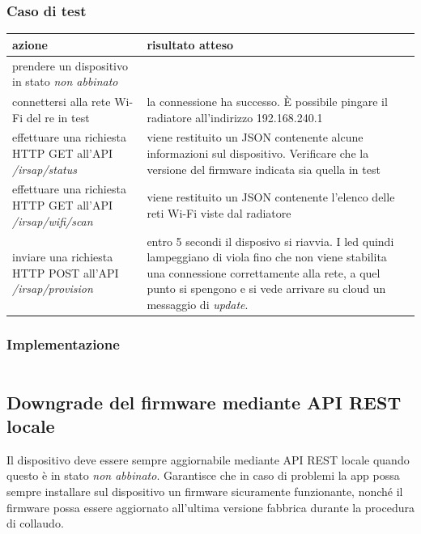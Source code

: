 \documentclass[12pt,a4paper,twoside,titlepage]{book}
\begin{document}
\subsubsection{Caso di test}
\begin{center}
\begin{tabular}{| p{} | p{} |}
    \hline \textbf{azione} & \textbf{risultato atteso} \\
    \hline prendere un dispositivo in stato \textit{non abbinato} & \\
    \hline connettersi alla rete Wi-Fi del \Gls{re} in test & la connessione ha successo. È possibile pingare il radiatore all'indirizzo 192.168.240.1 \\
    \hline effettuare una richiesta HTTP GET all'API \textit{/irsap/status} & viene restituito un JSON contenente alcune informazioni sul dispositivo. Verificare che la versione del \gls{firmware} indicata sia quella in test \\
    \hline effettuare una richiesta HTTP GET all'API \textit{/irsap/wifi/scan} & viene restituito un JSON contenente l'elenco delle reti Wi-Fi viste dal radiatore \\
    \hline inviare una richiesta HTTP POST all'API \textit{/irsap/provision} & entro 5 secondi il disposivo si riavvia. I led quindi lampeggiano di viola fino che non viene stabilita una connessione correttamente alla rete, a quel punto si spengono e si vede arrivare su cloud un messaggio di \textit{update}. \\
    \hline
\end{tabular}
\end{center}

\subsubsection{Implementazione}
\inputminted[]{python3}{src/test_pairing.py}

\subsection{Downgrade del firmware mediante API REST locale}
\label{section:test_downgrade}

Il dispositivo deve essere sempre aggiornabile mediante API REST locale quando questo
è in stato \textit{non abbinato}. Garantisce che in caso di problemi la app possa sempre
installare sul dispositivo un \gls{firmware} sicuramente funzionante, nonché il \gls{firmware}
possa essere aggiornato all’ultima versione fabbrica durante la procedura di collaudo.
\end{document}
